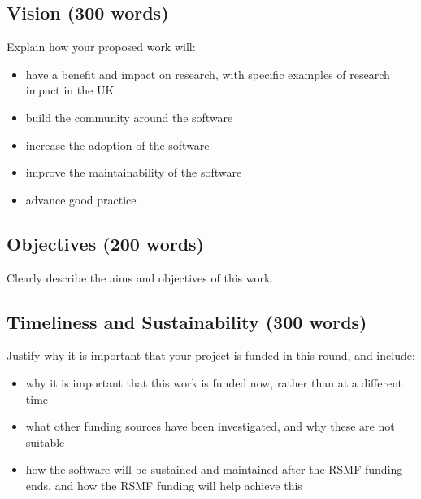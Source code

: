 \documentclass[12pt]{article}
\newenvironment{instruction}{%
    \begin{tcolorbox}[colback=red!5,colframe=red,title=Instruction]%
}{%
    \end{tcolorbox}%
}
\begin{document}
\subsection{Vision (300 words)}

\begin{instruction}

Explain how your proposed work will:

\begin{itemize}
    \item have a benefit and impact on research, with specific examples of research impact in the UK
    \item build the community around the software
    \item increase the adoption of the software
    \item improve the maintainability of the software
    \item advance good practice
\end{itemize}

\end{instruction}



\subsection{Objectives (200 words)}

\begin{instruction}

Clearly describe the aims and objectives of this work.

\end{instruction}



\subsection{Timeliness and Sustainability (300 words)}

\begin{instruction}

Justify why it is important that your project is funded in this round, and include:

    \begin{itemize}
        \item why it is important that this work is funded now, rather than at a different time
        \item what other funding sources have been investigated, and why these are not suitable
        \item how the software will be sustained and maintained after the RSMF funding ends, and how the RSMF funding will help achieve this
    \end{itemize}

\end{instruction}
\end{document}
